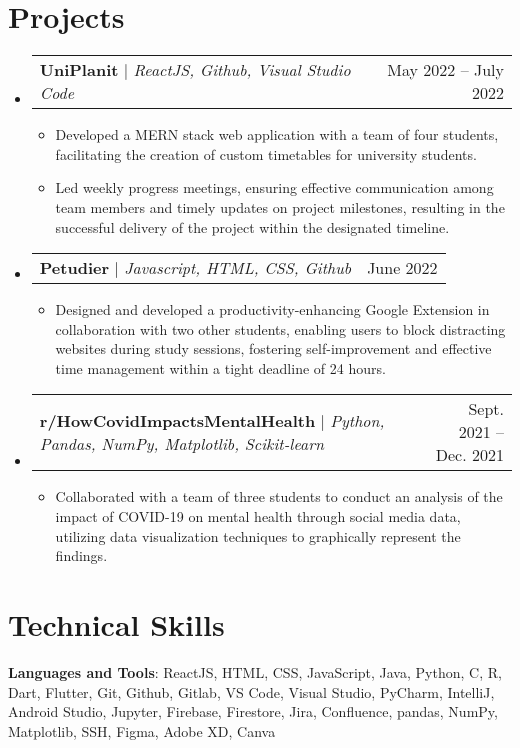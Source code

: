 \documentclass[letterpaper,11pt]{article}
\makeatletter
\newcommand{\resumeItem}[1]{
  \item\small{
    {#1 \vspace{-2pt}}
  }
}
\newcommand{\resumeProjectHeading}[2]{
    \item
    \begin{tabular*}{0.97\textwidth}{l@{\extracolsep{\fill}}r}
      \small#1 & #2 \\
    \end{tabular*}\vspace{-7pt}
}
\newcommand{\resumeSubHeadingListStart}{\begin{itemize}[leftmargin=0.15in, label={}]}
\newcommand{\resumeSubHeadingListEnd}{\end{itemize}}
\newcommand{\resumeItemListStart}{\begin{itemize}}
\newcommand{\resumeItemListEnd}{\end{itemize}\vspace{-5pt}}
\makeatother
\begin{document}
\section{Projects}
    \resumeSubHeadingListStart
      \resumeProjectHeading
          {\textbf{UniPlanit} $|$ \emph{ReactJS,  Github, Visual Studio Code}}{May 2022 -- July 2022}
          \resumeItemListStart
            \resumeItem{Developed a MERN stack web application with a team of four students, facilitating the creation of custom timetables for university students.}
            \resumeItem{Led weekly progress meetings, ensuring effective communication among team members and timely updates on project milestones, resulting in the successful delivery of the project within the designated timeline.}
          \resumeItemListEnd
      \resumeProjectHeading
          {\textbf{Petudier} $|$ \emph{Javascript, HTML, CSS, Github}}{June 2022}
          \resumeItemListStart
            \resumeItem{Designed and developed a productivity-enhancing Google Extension in collaboration with two other students, enabling users to block distracting websites during study sessions, fostering self-improvement and effective time management within a tight deadline of 24 hours.}
          \resumeItemListEnd
        \resumeProjectHeading   {\textbf{r/HowCovidImpactsMentalHealth} $|$ \emph{Python, Pandas, NumPy, Matplotlib, Scikit-learn}}{Sept. 2021 -- Dec. 2021}
          \resumeItemListStart
            \resumeItem{Collaborated with a team of three students to conduct an analysis of the impact of COVID-19 on mental health through social media data, utilizing data visualization techniques to graphically represent the findings.}
          \resumeItemListEnd
    \resumeSubHeadingListEnd



%
\section{Technical Skills}
 \begin{itemize}[leftmargin=0.15in, label={}]
    \small{\item{
     \textbf{Languages and Tools}{: ReactJS, HTML, CSS, JavaScript, Java, Python, C, R, Dart, Flutter, Git, Github, Gitlab, VS Code, Visual Studio, PyCharm, IntelliJ, Android Studio, Jupyter, Firebase, Firestore, Jira, Confluence, pandas, NumPy, Matplotlib, SSH, Figma, Adobe XD, Canva} \\
    }}
 \end{itemize}


\end{document}
